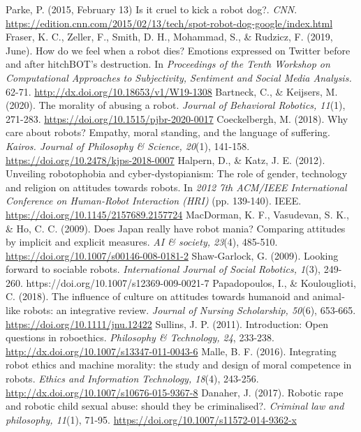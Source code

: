 \documentclass[a4j,12pt]{jreport}
\begin{document}
\renewcommand{\bibname}{引用文献}
\begin{thebibliography}{999}
 Parke, P. (2015, February 13) Is it cruel to kick a robot dog?. \textsl{CNN}. \url{https://edition.cnn.com/2015/02/13/tech/spot-robot-dog-google/index.html}
 Fraser, K. C., Zeller, F., Smith, D. H., Mohammad, S., \& Rudzicz, F. (2019, June). How do we feel when a robot dies? Emotions expressed on Twitter before and after hitchBOT’s destruction. In \textsl{Proceedings of the Tenth Workshop on Computational Approaches to Subjectivity, Sentiment and Social Media Analysis.} 62-71. \url{http://dx.doi.org/10.18653/v1/W19-1308}
 Bartneck, C., \& Keijsers, M. (2020). The morality of abusing a robot. \textsl{Journal of Behavioral Robotics, 11}(1), 271-283. \url{https://doi.org/10.1515/pjbr-2020-0017}
 Coeckelbergh, M. (2018). Why care about robots? Empathy, moral standing, and the language of suffering. \textsl{Kairos. Journal of Philosophy \& Science, 20}(1), 141-158. \url{https://doi.org/10.2478/kjps-2018-0007}
 Halpern, D., \& Katz, J. E. (2012). Unveiling robotophobia and cyber-dystopianism: The role of gender, technology and religion on attitudes towards robots. In \textsl{2012 7th ACM/IEEE International Conference on Human-Robot Interaction (HRI)} (pp. 139-140). IEEE. \url{https://doi.org/10.1145/2157689.2157724}
 MacDorman, K. F., Vasudevan, S. K., \& Ho, C. C. (2009). Does Japan really have robot mania? Comparing attitudes by implicit and explicit measures. \textsl{AI \& society, 23}(4), 485-510. \url{https://doi.org/10.1007/s00146-008-0181-2}
 Shaw-Garlock, G. (2009). Looking forward to sociable robots. \textsl{International Journal of Social Robotics, 1}(3), 249-260. https://doi.org/10.1007/s12369-009-0021-7 
 Papadopoulos, I., \& Koulouglioti, C. (2018). The influence of culture on attitudes towards humanoid and animal‐like robots: an integrative review. \textsl{Journal of Nursing Scholarship, 50}(6), 653-665. \url{https://doi.org/10.1111/jnu.12422}
 Sullins, J. P. (2011). Introduction: Open questions in roboethics.
\textsl{Philosophy \& Technology, 24}, 233-238. \url{http://dx.doi.org/10.1007/s13347-011-0043-6}
 Malle, B. F. (2016). Integrating robot ethics and machine morality: the study and design of moral competence in robots. \textsl{Ethics and Information Technology, 18}(4), 243-256. \url{http://dx.doi.org/10.1007/s10676-015-9367-8}
 Danaher, J. (2017). Robotic rape and robotic child sexual abuse: should they be criminalised?. \textsl{Criminal law and philosophy, 11}(1), 71-95. \url{https://doi.org/10.1007/s11572-014-9362-x}

\end{thebibliography}
\end{document}

